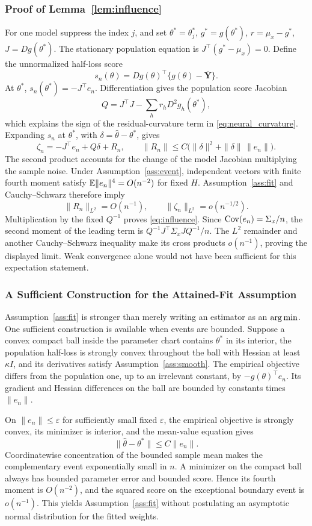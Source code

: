 \subsubsection{Proof of Lemma~\ref{lem:influence}}
For one model suppress the index $j$, and set $\theta^*=\theta_j^*$, $g^*=g(\theta^*)$, $r=\mu_x-g^*$, $J=Dg(\theta^*)$. The stationary population equation is $J^\top(g^*-\mu_x)=0$. Define the unnormalized half-loss score
\[
 s_n(\theta)=Dg(\theta)^\top\{g(\theta)-\overline{\mathbf Y}\}.
\]
At $\theta^*$, $s_n(\theta^*)=-J^\top e_n$. Differentiation gives the population score Jacobian
\[
 Q=J^\top J-\sum_h r_hD^2g_h(\theta^*),
\]
which explains the sign of the residual-curvature term in \eqref{eq:neural_curvature}. Expanding $s_n$ at $\theta^*$, with $\delta=\widehat\theta-\theta^*$, gives
\[
 \zeta_n=-J^\top e_n+Q\delta+R_n,\qquad
 \|R_n\|\le C\bigl(\|\delta\|^2+\|\delta\|\,\|e_n\|\bigr).
\]
The second product accounts for the change of the model Jacobian multiplying the sample noise. Under Assumption~\ref{ass:event}, independent vectors with finite fourth moment satisfy $\mathbb E\|e_n\|^4=O(n^{-2})$ for fixed $H$. Assumption~\ref{ass:fit} and Cauchy--Schwarz therefore imply
\[
 \|R_n\|_{L^2}=O(n^{-1}),\qquad
 \|\zeta_n\|_{L^2}=o(n^{-1/2}).
\]
Multiplication by the fixed $Q^{-1}$ proves \eqref{eq:influence}. Since $\operatorname{Cov}(e_n)=\Sigma_x/n$, the second moment of the leading term is $Q^{-1}J^\top\Sigma_xJQ^{-1}/n$. The $L^2$ remainder and another Cauchy--Schwarz inequality make its cross products $o(n^{-1})$, proving the displayed limit. Weak convergence alone would not have been sufficient for this expectation statement.

\subsubsection{A Sufficient Construction for the Attained-Fit Assumption}
Assumption~\ref{ass:fit} is stronger than merely writing an estimator as an $\operatorname*{arg\,min}$. One sufficient construction is available when events are bounded. Suppose a convex compact ball inside the parameter chart contains $\theta^*$ in its interior, the population half-loss is strongly convex throughout the ball with Hessian at least $\kappa I$, and its derivatives satisfy Assumption~\ref{ass:smooth}. The empirical objective differs from the population one, up to an irrelevant constant, by $-g(\theta)^\top e_n$. Its gradient and Hessian differences on the ball are bounded by constants times $\|e_n\|$.

On $\|e_n\|\le\varepsilon$ for sufficiently small fixed $\varepsilon$, the empirical objective is strongly convex, its minimizer is interior, and the mean-value equation gives
\[
 \|\widehat\theta-\theta^*\|\le C\|e_n\|.
\]
Coordinatewise concentration of the bounded sample mean makes the complementary event exponentially small in $n$. A minimizer on the compact ball always has bounded parameter error and bounded score. Hence its fourth moment is $O(n^{-2})$, and the squared score on the exceptional boundary event is $o(n^{-1})$. This yields Assumption~\ref{ass:fit} without postulating an asymptotic normal distribution for the fitted weights.

